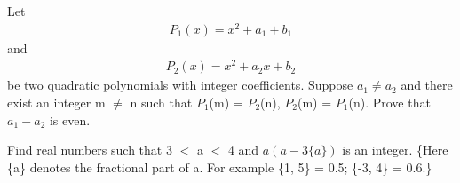 \item Let
\begin{align} 
P_1(x) = x^2 + a_1 + b_1  
\end{align}
and
\begin{align} 
P_2(x) = x^2 + a_2x + b_2
\end{align} 
be two quadratic polynomials with integer coefficients. Suppose $a_1 \neq a_2$ and there exist an integer 
m $\neq$ n such that $P_1$(m) = $P_2$(n), $P_2$(m) = $P_1$(n). Prove that $a_1-a_2$ is even.

\item Find real numbers such that 3 $<$ a $<$ 4 and $a(a-3\{a\})$ is an integer. 
\{Here \{a\} denotes the fractional part of a. For example \{1, 5\} = 0.5; \{-3, 4\} = 0.6.\}
